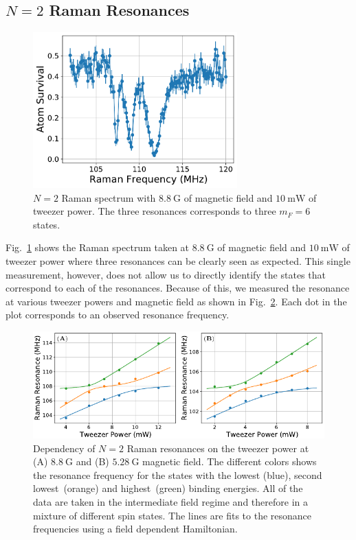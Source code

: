 \subsection{$N=2$ Raman Resonances}
\label{ch:raman-spectroscopy:n2:resonances}

\begin{figure}
  \centering
  \includegraphics[width=0.7\textwidth]{figures/raman_spectroscopy_n2_resonance.pdf}
  \caption[$N=2$ Raman spectrum.]{
    $N=2$ Raman spectrum with $8.8~\mathrm{G}$ of magnetic field
    and $10~\mathrm{mW}$ of tweezer power.
    The three resonances corresponds to three $m_F=6$ states.
    \label{fig:raman-spectroscopy:n2}}
\end{figure}

Fig.~\ref{fig:raman-spectroscopy:n2} shows the Raman spectrum taken
at $8.8~\mathrm{G}$ of magnetic field and $10~\mathrm{mW}$ of tweezer power
where three resonances can be clearly seen as expected.
This single measurement, however, does not allow us to directly identify the states
that correspond to each of the resonances.
Because of this, we measured the resonance at various tweezer powers and magnetic field
as shown in Fig.~\ref{fig:raman-spectroscopy:n2-fit}.
Each dot in the plot corresponds to an observed resonance frequency.

\begin{figure}
  \centering
  \includegraphics[width=\textwidth]{figures/raman_spectroscopy_n2_fit.pdf}
  \caption[$N=2$ Raman resonances and fitting to external field strengths.]{
    Dependency of $N=2$ Raman resonances on the tweezer power at
    (A) $8.8~\mathrm{G}$ and (B) $5.28~\mathrm{G}$ magnetic field.
    The different colors shows the resonance frequency for the states with
    the lowest (blue), second lowest~(orange) and highest~(green) binding energies.
    All of the data are taken in the intermediate field regime
    and therefore in a mixture of different spin states.
    The lines are fits to the resonance frequencies using a field dependent Hamiltonian.
    \label{fig:raman-spectroscopy:n2-fit}}
\end{figure}

